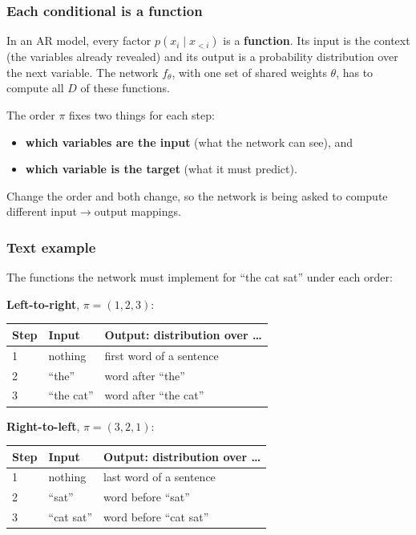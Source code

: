 \subsubsection*{Each conditional is a function}

In an AR model, every factor $p(x_i \mid x_{<i})$ is a \textbf{function}. Its input is the context (the variables already revealed) and its output is a probability distribution over the next variable. The network $f_\theta$, with one set of shared weights $\theta$, has to compute all $D$ of these functions.

The order $\pi$ fixes two things for each step:
\begin{itemize}
  \item \textbf{which variables are the input} (what the network can see), and
  \item \textbf{which variable is the target} (what it must predict).
\end{itemize}
Change the order and both change, so the network is being asked to compute different input$\to$output mappings.

\subsubsection*{Text example}

The functions the network must implement for ``the cat sat'' under each order:

\textbf{Left-to-right}, $\pi=(1,2,3)$:

\begin{tabular}{lll}
\toprule
Step & Input & Output: distribution over \ldots \\
\midrule
1 & nothing & first word of a sentence \\
2 & ``the'' & word after ``the'' \\
3 & ``the cat'' & word after ``the cat'' \\
\bottomrule
\end{tabular}

\textbf{Right-to-left}, $\pi=(3,2,1)$:

\begin{tabular}{lll}
\toprule
Step & Input & Output: distribution over \ldots \\
\midrule
1 & nothing & last word of a sentence \\
2 & ``sat'' & word before ``sat'' \\
3 & ``cat sat'' & word before ``cat sat'' \\
\bottomrule
\end{tabular}

